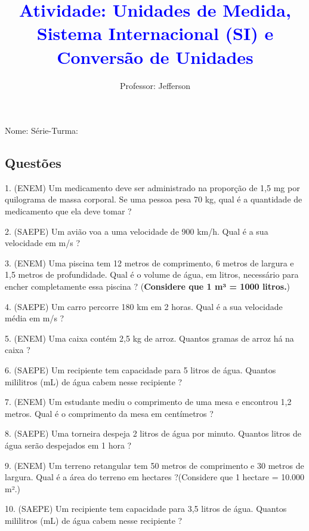 \documentclass[12pt]{article}
\title{\textcolor{blue}{Atividade: Unidades de Medida, Sistema Internacional (SI) e Conversão de Unidades}}
\author{Professor: Jefferson}
\date{}
\begin{document}
\maketitle
\thispagestyle{empty}

\begin{center}
\large{Nome: \underline{\hspace{8cm}} \quad Série-Turma: \underline{\hspace{3cm}}}
\end{center}

\vspace{1cm}

\begin{multicols}{2}

\section*{Questões}

1. (ENEM) Um medicamento deve ser administrado na proporção de 1,5 mg por quilograma de massa corporal. Se uma pessoa
    pesa 70 kg, qual é a quantidade de medicamento que ela deve tomar ?\newline

2. (SAEPE) Um avião voa a uma velocidade de 900 km/h. Qual é a sua velocidade em m/s ?\newline  

3. (ENEM) Uma piscina tem 12 metros de comprimento, 6 metros de largura e 1,5 metros de profundidade. Qual é o volume de
    água, em litros, necessário para encher completamente essa piscina ? (\textbf{Considere que 1 m³ = 1000
    litros.}) \newline 

4. (SAEPE) Um carro percorre 180 km em 2 horas. Qual é a sua velocidade média em m/s ?\newline  

5. (ENEM) Uma caixa contém 2,5 kg de arroz. Quantos gramas de arroz há na caixa ?\newline  

6. (SAEPE) Um recipiente tem capacidade para 5 litros de água. Quantos mililitros (mL) de água cabem nesse recipiente ?\newline  

7. (ENEM) Um estudante mediu o comprimento de uma mesa e encontrou 1,2 metros. Qual é o comprimento da mesa em centímetros ?\newline  

8. (SAEPE) Uma torneira despeja 2 litros de água por minuto. Quantos litros de água serão despejados em 1 hora ?\newline  

9. (ENEM) Um terreno retangular tem 50 metros de comprimento e 30 metros de largura. Qual é a área do terreno em hectares ?\newline (Considere que 1 hectare = 10.000 m².)  

10. (SAEPE) Um recipiente tem capacidade para 3,5 litros de água. Quantos mililitros (mL) de água cabem nesse recipiente ?\newline  

\end{multicols}

\newpage %
\end{document}
